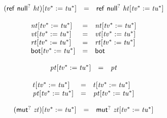 $$
\begin{array}[t]{@{}lcl@{}l@{}}
{(\mathsf{ref}~{\mathsf{null}^?}~{\mathit{ht}})}{{}[ {{\mathit{tv}}^\ast} := {{\mathit{tu}}^\ast} ]} & = & \mathsf{ref}~{\mathsf{null}^?}~{{\mathit{ht}}}{{}[ {{\mathit{tv}}^\ast} := {{\mathit{tu}}^\ast} ]} \\
\end{array}
$$

$$
\begin{array}[t]{@{}lcl@{}l@{}}
{{\mathit{nt}}}{{}[ {{\mathit{tv}}^\ast} := {{\mathit{tu}}^\ast} ]} & = & {{\mathit{nt}}}{{}[ {{\mathit{tv}}^\ast} := {{\mathit{tu}}^\ast} ]} \\
{{\mathit{vt}}}{{}[ {{\mathit{tv}}^\ast} := {{\mathit{tu}}^\ast} ]} & = & {{\mathit{vt}}}{{}[ {{\mathit{tv}}^\ast} := {{\mathit{tu}}^\ast} ]} \\
{{\mathit{rt}}}{{}[ {{\mathit{tv}}^\ast} := {{\mathit{tu}}^\ast} ]} & = & {{\mathit{rt}}}{{}[ {{\mathit{tv}}^\ast} := {{\mathit{tu}}^\ast} ]} \\
{\mathsf{bot}}{{}[ {{\mathit{tv}}^\ast} := {{\mathit{tu}}^\ast} ]} & = & \mathsf{bot} \\
\end{array}
$$

$$
\begin{array}[t]{@{}lcl@{}l@{}}
{{\mathit{pt}}}{{}[ {{\mathit{tv}}^\ast} := {{\mathit{tu}}^\ast} ]} & = & {\mathit{pt}} \\
\end{array}
$$

$$
\begin{array}[t]{@{}lcl@{}l@{}}
{t}{{}[ {{\mathit{tv}}^\ast} := {{\mathit{tu}}^\ast} ]} & = & {t}{{}[ {{\mathit{tv}}^\ast} := {{\mathit{tu}}^\ast} ]} \\
{{\mathit{pt}}}{{}[ {{\mathit{tv}}^\ast} := {{\mathit{tu}}^\ast} ]} & = & {{\mathit{pt}}}{{}[ {{\mathit{tv}}^\ast} := {{\mathit{tu}}^\ast} ]} \\
\end{array}
$$

$$
\begin{array}[t]{@{}lcl@{}l@{}}
{({\mathsf{mut}^?}~{\mathit{zt}})}{{}[ {{\mathit{tv}}^\ast} := {{\mathit{tu}}^\ast} ]} & = & {\mathsf{mut}^?}~{{\mathit{zt}}}{{}[ {{\mathit{tv}}^\ast} := {{\mathit{tu}}^\ast} ]} \\
\end{array}
$$


